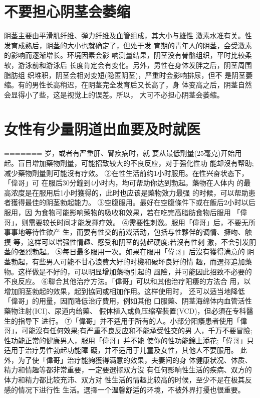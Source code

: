 \documentclass[12pt,UTF8]{ctexbook}
\begin{document}
\section{不要担心阴茎会萎缩}
阴茎主要由平滑肌纤维、弹力纤维及血管组成，其大小与雄性
激素水准有关。性发育成熟后，阴茎的大小也就确定了，但处于发
育期的青年人的阴茎，会受激素的影响而逐渐增长。环境因素会影
响测量结果，阴茎没有骨骼组织，平时比较柔软，游泳前和游泳后
长度肯定会有变化。另外，男性在身体发胖之后，阴茎周围脂肪组
织堆积，阴茎会相对变短(隐匿阴茎)，严重时会影响排尿，但不
是阴茎萎缩。有的男性长高稍迟，在阴茎完全发育后又长高了，身
体变高之后，阴茎自然会显得小了些，这是视觉上的误差。所以，
大可不必担心阴茎会萎缩。

\section{女性有少量阴道出血要及时就医}
=======
岁，或者有严重肝、腎疾病时，就
要从最低劑量(25毫克)开始用
起。盲目增加藥物劑量，可能招致较大的不良反应，对于强化性功
能却沒有帮助;减少藥物劑量则可能沒有疗效。
②在性生活前约1小时服用。在性兴奋状态下，「偉哥」可
在服后30分鐘到4小时内，均可帮助你达到勃起。藥物在人体内
的最高浓度是在服用后1小时獲得的，此时也应该是藥物效力最强
的时候，可以帮助患者獲得最佳的阴茎勃起能力。
③空腹服用。最好在空腹條件下或在飯后2小时以后服用，因
为食物可能影响藥物的吸收和效果，若在吃完高脂肪食物后服用
「偉哥」，则需要较长时间才能发揮疗效。
④需要性刺激。服用「偉哥」后，不要无所事事地等待性欲产
生，而要有性交的前戏活动，包括与性夥伴的调情、擁吻、触摸
等，这样可以增强性情趣、感受和阴茎的勃起硬度;若沒有性刺
激，不会引发阴茎的强烈勃起。
⑤每日最多服用一次。如果在服用「偉哥」后沒有獲得满意的
阴茎勃起，有些男人可能不甘心浪費大好的时機和破坏良好的情
趣，而選擇追加藥物。这样做是不好的，可以明显增加藥物引起的
風險，并可能因此招致不必要的不良反应。
⑥聯合其他治疗方法。「偉哥」可以和其他治疗阳痿的方法合
用，以增加阴茎勃起的效果，起到協同或相加作用。这样使用时，
还可以适当地降低「偉哥」的用量，因而降低治疗費用，例如其他
口服藥、阴茎海绵体内血管活性藥物注射(ICI)、尿道内给藥、
假体植入或負压缩窄裝置(VCD)，但必須在专科醫生的指导下
进行。
⑦「偉哥」并不适用于所有的人。小部分阳痿患者使用「偉
哥」，可能沒有任何效果;有严重不良反应和不能承受性交的男
人，千万不要冒險;性功能正常的健康男人，服用「偉哥」并不能
使你的性功能錦上添花;「偉哥」只适用于治疗男性勃起功能障
礙，并不适用于儿童及女性，其他人不要服用。
此外，为了使「偉哥」治疗能夠獲得满意的效果，夫妻间的身
体健康状况、体质、精力和情趣等都非常重要，一定要選擇双方沒
有任何影响性生活的疾病、双方的体力和精力都比较充沛、双方对
性生活的情趣比较高的时候，至少不是在极其反感的情况下进行性
生活。選擇一个温馨舒适的环境，不被外界打擾也很重要。
\end{document}
